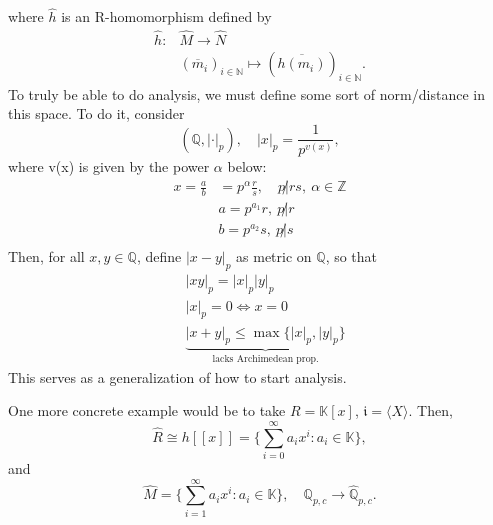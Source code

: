 \documentclass[../category_theory.tex]{subfiles}
\begin{document}
\begin{example}
\begin{center}
	\end{center}
	where \(\hat{h}\) is an R-homomorphism defined by
	\begin{align*}
		\hat{h}: & \hat{M}\rightarrow \hat{N}                                                           \\
		         & (\overline{m}_{i})_{i\in \mathbb{N}}\mapsto (\overline{h(m_{i})})_{i\in \mathbb{N}}.
	\end{align*}
	To truly be able to do analysis, we must define some sort of norm/distance in this space. To do it, consider
	\[
		(\mathbb{Q}, |\cdot |_{p}),\quad |x|_{p}=\frac{1}{p ^{v(x)}},
	\]
	where v(x) is given by the power \(\alpha\) below:
	\begin{align*}
		x = \frac{a}{b} & = p ^{\alpha}\frac{r}{s},\quad p\not|rs,\: \alpha\in \mathbb{Z} \\
		                & a = p ^{a_{1}}r, \: p\not|r                                     \\
		                & b = p ^{a_{2}}s, \: p\not|s                                     \\
	\end{align*}
	Then, for all \(x, y\in \mathbb{Q}\), define \(|x-y|_{p}\) as metric on \(\mathbb{Q}\), so that
	\begin{align*}
		 & |xy|_{p}=|x|_{p}|y|_{p}                                                                 \\
		 & |x|_{p}=0 \Longleftrightarrow x=0                                                       \\
		 & \underbrace{|x+y|_{p}\leq \max_{}\{|x|_{p}, |y|_{p}\}}_{\text{lacks Archimedean prop.}}
	\end{align*}
	This serves as a generalization of how to start analysis.

	One more concrete example would be to take \(R=\mathbb{K}[x]\), \(\mathfrak{i}= \langle X \rangle\). Then,
	\[
		\hat{R}\cong h[[x]]= \biggl\{\sum\limits_{i=0}^{\infty}a_{i}x^{i}: a_{i}\in \mathbb{K}\biggr\},
	\]
	and
	\[
		\hat{M}=\biggl\{\sum\limits_{i=1}^{\infty}a_{i}x^{i}: a_{i}\in \mathbb{K}\biggr\},\quad \mathbb{Q}_{p, c}\rightarrow \hat{\mathbb{Q}}_{p, c}.
	\]
\end{example}
\end{document}
